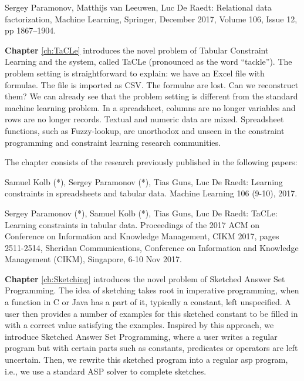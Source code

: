 \begin{addmargin}[2em]{2em}

Sergey Paramonov,  Matthijs van Leeuwen, Luc De Raedt: Relational data
factorization, Machine Learning, Springer, December 2017, Volume 106,
    Issue 12, pp 1867–1904.

\end{addmargin}



\textbf{Chapter} \ref{ch:TaCLe} introduces  the novel problem of
Tabular Constraint Learning and the system, called TaCLe (pronounced
as the word ``tackle''). The problem setting is straightforward to
explain: we have an Excel file with formulae. The file is imported as
CSV. The formulae are lost. Can we reconstruct them? We can already 
see that the problem setting is different from the standard machine
learning problem. In a spreadsheet, columns are no longer variables
and rows are no longer records. Textual and numeric data are mixed.
Spreadsheet functions, such as Fuzzy-lookup, are unorthodox and unseen in
the constraint programming and constraint learning research communities.

The chapter consists of the research previously published in the following papers:

\begin{addmargin}[2em]{2em}
Samuel Kolb (*), Sergey Paramonov (*), Tias Guns, Luc De Raedt:
  Learning constraints in spreadsheets and tabular data. Machine
  Learning 106 (9-10), 2017.


Sergey Paramonov (*), Samuel Kolb (*), Tias Guns, Luc De Raedt:
TaCLe: Learning constraints in tabular data. 
 Proceedings of the 2017 ACM on Conference on Information and
    Knowledge Management, CIKM 2017, pages 2511-2514, Sheridan
    Communications, Conference on Information and Knowledge Management
    (CIKM), Singapore, 6-10 Nov 2017.
\end{addmargin}


\textbf{Chapter} \ref{ch:Sketching} introduces the novel problem of
Sketched Answer Set Programming. The idea of sketching takes root in
imperative programming, when a function in C or Java has a part of it,
typically a constant, left unspecified. A user then provides a number
of examples for this sketched constant to be filled in with a
correct value satisfying the examples. Inspired by this approach, we
introduce Sketched Answer Set Programming, where a user writes a
regular program but with certain parts such as constants, predicates
or operators are left uncertain. Then, we rewrite this sketched
program into a regular \acrlong{asp} program, i.e., we use a standard ASP solver
to complete sketches.


